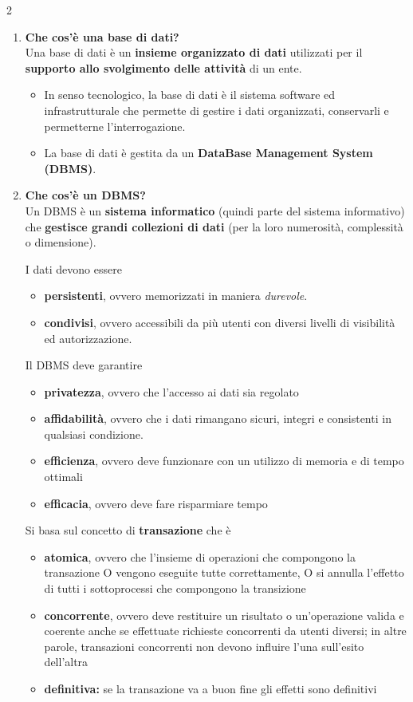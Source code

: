 \documentclass{article}
\newcommand{\sitemize}[1]{%
  \begin{itemize}[label=$\diamond$]
    #1
  \end{itemize}
}
\begin{document}
\begin{multicols}{2}
\begin{enumerate}[leftmargin=*, align=left]
		\item \textbf{Che cos'è una base di dati?} \\
		Una base di dati è un \textbf{insieme organizzato di dati} utilizzati per il \textbf{supporto allo svolgimento delle attività} di un ente.
		\sitemize{\item In senso tecnologico, la base di dati è il sistema software ed infrastrutturale che permette di gestire i dati organizzati, conservarli e permetterne l'interrogazione. \item La base di dati è gestita da un \textbf{DataBase Management System (DBMS)}. }
		\item \textbf{Che cos'è un DBMS?} \\
		Un DBMS è un \textbf{sistema informatico} (quindi parte del sistema informativo) che \textbf{gestisce grandi collezioni di dati} (per la loro numerosità, complessità o dimensione). 
		
		I dati devono essere
		\sitemize{\item \textbf{persistenti}, ovvero memorizzati in maniera \textit{durevole}. \item \textbf{condivisi}, ovvero accessibili da più utenti con diversi livelli di visibilità ed autorizzazione.}
		
		Il DBMS deve garantire
		\sitemize{
			\item \textbf{privatezza}, ovvero che l'accesso ai dati sia regolato \item \textbf{affidabilità}, ovvero che i dati rimangano sicuri, integri e consistenti in qualsiasi condizione. \item \textbf{efficienza}, ovvero deve funzionare con un utilizzo di memoria e di tempo ottimali \item \textbf{efficacia}, ovvero deve fare risparmiare tempo}
		
		Si basa sul concetto di \textbf{transazione} che è\sitemize{\item \textbf{atomica}, ovvero che l'insieme di operazioni che compongono la transazione O vengono eseguite tutte correttamente, O si annulla l'effetto di tutti i sottoprocessi che compongono la transizione \item \textbf{concorrente}, ovvero deve restituire un risultato o un'operazione valida e coerente anche se effettuate richieste concorrenti da utenti diversi; in altre parole, transazioni concorrenti non devono influire l'una sull'esito dell'altra
			\item \textbf{definitiva:} se la transazione va a buon fine gli effetti sono definitivi}
		

\end{enumerate}
\end{multicols}
\end{document}
